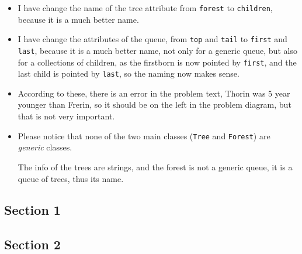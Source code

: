 \documentclass[a4paper, 9pt]{extarticle}
\begin{document}
\begin{itemize}

  \item I have change the name of the tree attribute from \texttt{forest} to
    \texttt{children}, because it is a much better name.

  \item I have change the attributes of the queue, from \texttt{top} and
    \texttt{tail} to \texttt{first} and \texttt{last}, because it is a much
    better name, not only for a generic queue, but also for a collections of
    children, as the firstborn is now pointed by \texttt{first}, and the last
    child is pointed by \texttt{last}, so the naming now makes sense.

  \item According to these, there is an error in the problem text, Thorin was 5
    year younger than Frerin, so it should be on the left in the problem
    diagram, but that is not very important.

  \item Please notice that none of the two main classes (\texttt{Tree} and
    \texttt{Forest}) are \emph{generic} classes.

    The info of the trees are strings, and the forest is not a generic queue,
    it is a queue of trees, thus its name.

\end{itemize}

\newpage

\subsection{Section 1}

\begin{multicols}{2}


  \columnbreak


\end{multicols}




\newpage

\subsection{Section 2}
\end{document}
